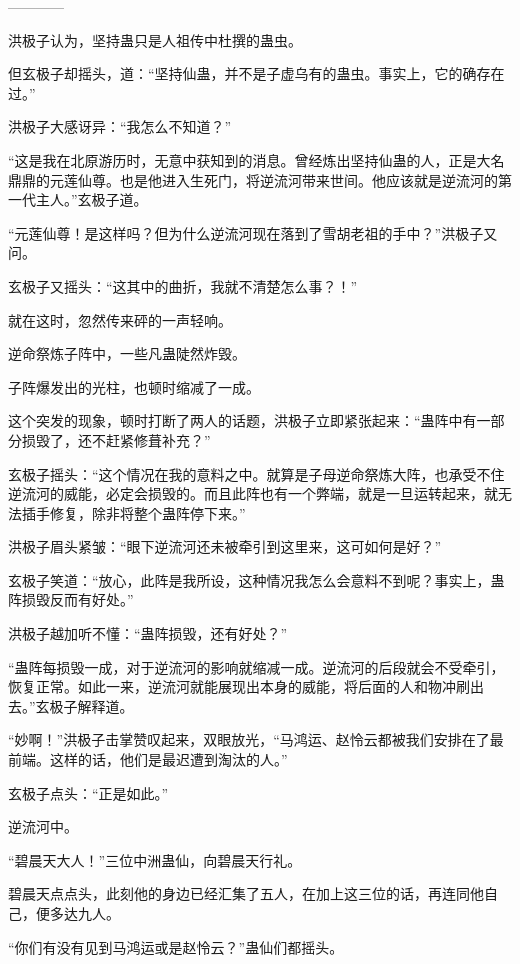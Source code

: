 
\begin{this_body}

------------

洪极子认为，坚持蛊只是人祖传中杜撰的蛊虫。

但玄极子却摇头，道：“坚持仙蛊，并不是子虚乌有的蛊虫。事实上，它的确存在过。”

洪极子大感讶异：“我怎么不知道？”

“这是我在北原游历时，无意中获知到的消息。曾经炼出坚持仙蛊的人，正是大名鼎鼎的元莲仙尊。也是他进入生死门，将逆流河带来世间。他应该就是逆流河的第一代主人。”玄极子道。

“元莲仙尊！是这样吗？但为什么逆流河现在落到了雪胡老祖的手中？”洪极子又问。

玄极子又摇头：“这其中的曲折，我就不清楚怎么事？！”

就在这时，忽然传来砰的一声轻响。

逆命祭炼子阵中，一些凡蛊陡然炸毁。

子阵爆发出的光柱，也顿时缩减了一成。

这个突发的现象，顿时打断了两人的话题，洪极子立即紧张起来：“蛊阵中有一部分损毁了，还不赶紧修葺补充？”

玄极子摇头：“这个情况在我的意料之中。就算是子母逆命祭炼大阵，也承受不住逆流河的威能，必定会损毁的。而且此阵也有一个弊端，就是一旦运转起来，就无法插手修复，除非将整个蛊阵停下来。”

洪极子眉头紧皱：“眼下逆流河还未被牵引到这里来，这可如何是好？”

玄极子笑道：“放心，此阵是我所设，这种情况我怎么会意料不到呢？事实上，蛊阵损毁反而有好处。”

洪极子越加听不懂：“蛊阵损毁，还有好处？”

“蛊阵每损毁一成，对于逆流河的影响就缩减一成。逆流河的后段就会不受牵引，恢复正常。如此一来，逆流河就能展现出本身的威能，将后面的人和物冲刷出去。”玄极子解释道。

“妙啊！”洪极子击掌赞叹起来，双眼放光，“马鸿运、赵怜云都被我们安排在了最前端。这样的话，他们是最迟遭到淘汰的人。”

玄极子点头：“正是如此。”

逆流河中。

“碧晨天大人！”三位中洲蛊仙，向碧晨天行礼。

碧晨天点点头，此刻他的身边已经汇集了五人，在加上这三位的话，再连同他自己，便多达九人。

“你们有没有见到马鸿运或是赵怜云？”蛊仙们都摇头。


\end{this_body}
